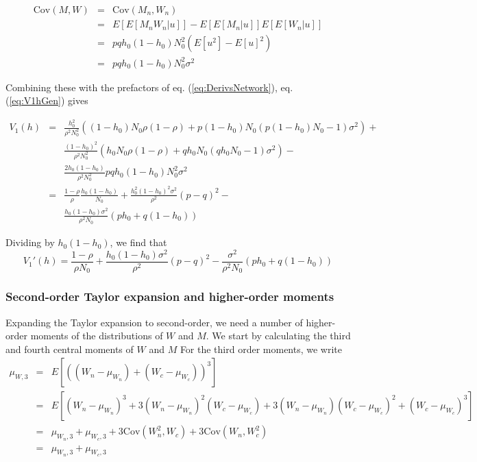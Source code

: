 \documentclass{article}
\begin{document}
    \begin{eqnarray}
  \mathrm{Cov}(M,W) & = &\mathrm{Cov}(M_n,W_n) \\
    & = &E[E[M_nW_n|u]]-E[E[M_n|u]]E[E[W_n|u]]\\
    & = &pqh_0(1-h_0)N_0^2(E[u^2]-E[u]^2)\\
    & = &pqh_0(1-h_0)N_0^2\sigma^2 \label{eq:CovMW_NetStoch}
    \end{eqnarray}

Combining these with the prefactors of eq. (\ref{eq:DerivsNetwork}), eq. (\ref{eq:V1hGen}) gives

    \begin{eqnarray}
      V_1(h) & = &\frac{h_0^2}{\rho^2N_0^2}  ((1-h_0)N_0\rho(1-\rho)+p(1-h_0)N_0(p(1-h_0)N_0-1)\sigma^2) + \nonumber \\
      && \frac{(1-h_0)^2}{\rho^2N_0^2}(h_0N_0\rho(1-\rho)+qh_0N_0(qh_0N_0-1)\sigma^2) - \nonumber \\
       && \frac{2h_0(1-h_0)}{\rho^2N_0^2}pqh_0(1-h_0)N_0^2\sigma^2\\
        & = & \frac{1-\rho}{\rho}\frac{h_0(1-h_0)}{N_0} +\frac{h_0^2(1-h_0)^2\sigma^2}{\rho^2}(p-q)^2 - \nonumber \\
        && \frac{h_0(1-h_0)\sigma^2}{\rho^2N_0}(ph_0+q(1-h_0))
    \end{eqnarray}

Dividing by $h_0(1-h_0)$, we find that
\begin{equation}\label{eq:V1hprime_NetStoch}
V_1'(h)=\frac{1-\rho}{\rho N_0} +\frac{h_0(1-h_0)\sigma^2}{\rho^2}(p-q)^2  -\frac{\sigma^2}{\rho^2N_0}(ph_0+q(1-h_0))
\end{equation}
\subsubsection*{Second-order Taylor expansion and higher-order moments}\label{app:V2hGen_Moments}

Expanding the Taylor expansion to second-order, we need a number of higher-order moments of the distributions of $W$ and $M$. We start by calculating the third and fourth central moments of $W$ and $M$
For the third order moments, we write
    \begin{eqnarray}
        \mu_{W,3}&=&E[((W_n-\mu_{W_n})+(W_c-\mu_{W_c}))^3]\\
        &=&E[(W_n-\mu_{W_n})^3+3(W_n-\mu_{W_n})^2(W_c-\mu_{W_c})+ 3(W_n-\mu_{W_n})(W_c-\mu_{W_c})^2+(W_c-\mu_{W_c})^3]\\
          &=&\mu_{W_n,3}+\mu_{W_c,3}+3\mathrm{Cov}(W_n^2,W_c)+ 3\mathrm{Cov}(W_n,W_c^2)\\
          &=&\mu_{W_n,3}+\mu_{W_c,3} \label{eq:thirdcentralW}
    \end{eqnarray}
\end{document}
